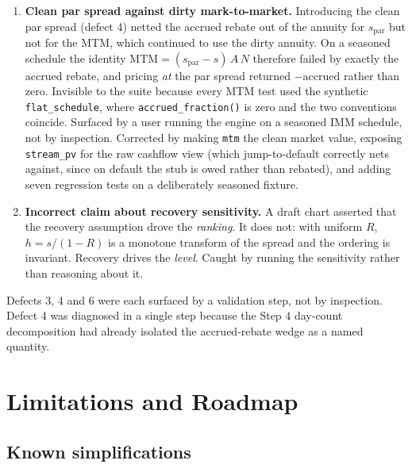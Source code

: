 \documentclass[11pt,a4paper]{article}
\newcommand{\keypoint}[1]{%
  \par\vspace{0.4em}\noindent
  \colorbox{codebg}{\parbox{\dimexpr\linewidth-2\fboxsep}{\small #1}}%
  \par\vspace{0.5em}}
\begin{document}
\begin{enumerate}[leftmargin=1.4em,itemsep=0.4em]
\item \textbf{Clean par spread against dirty mark-to-market.} Introducing the clean par
spread (defect 4) netted the accrued rebate out of the annuity for $s_{\text{par}}$ but not
for the MTM, which continued to use the dirty annuity. On a seasoned schedule the identity
$\text{MTM} = (s_{\text{par}} - s)\,A\,N$ therefore failed by exactly the accrued rebate, and
pricing \emph{at} the par spread returned $-\text{accrued}$ rather than zero. Invisible to the
suite because every MTM test used the synthetic \texttt{flat\_schedule}, where
\texttt{accrued\_fraction()} is zero and the two conventions coincide. Surfaced by a user
running the engine on a seasoned IMM schedule, not by inspection. Corrected by making
\texttt{mtm} the clean market value, exposing \texttt{stream\_pv} for the raw cashflow view
(which jump-to-default correctly nets against, since on default the stub is owed rather than
rebated), and adding seven regression tests on a deliberately seasoned fixture.

\item \textbf{Incorrect claim about recovery sensitivity.} A draft chart asserted that the
recovery assumption drove the \emph{ranking}. It does not: with uniform $R$, $h = s/(1-R)$ is
a monotone transform of the spread and the ordering is invariant. Recovery drives the
\emph{level}. Caught by running the sensitivity rather than reasoning about it.
\end{enumerate}

\keypoint{Defects 3, 4 and 6 were each surfaced by a validation step, not by inspection.
Defect 4 was diagnosed in a single step because the Step 4 day-count decomposition had already
isolated the accrued-rebate wedge as a named quantity.}

\newpage
\section{Limitations and Roadmap}

\subsection{Known simplifications}
\end{document}
